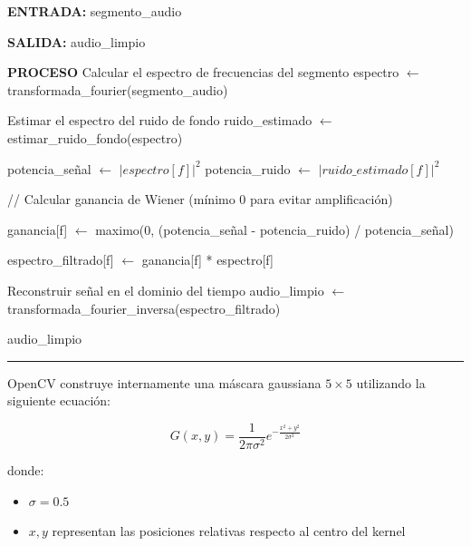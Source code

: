 \begin{algorithmic}[1]

\Statex \textbf{ENTRADA:}
\Statex segmento\_audio 

\Statex
\Statex \textbf{SALIDA:}
\Statex audio\_limpio 

\Statex
\Statex \textbf{PROCESO}
\State Calcular el espectro de frecuencias del segmento
\State espectro $\gets$ transformada\_fourier(segmento\_audio)

\Statex
\State Estimar el espectro del ruido de fondo
\State ruido\_estimado $\gets$ estimar\_ruido\_fondo(espectro)

\Statex
{}

    \State potencia\_señal $\gets$ $|espectro[f]|^2$
    \State potencia\_ruido $\gets$ $|ruido\_estimado[f]|^2$

    \Statex \hspace{0.5cm} // Calcular ganancia de Wiener (mínimo 0 para evitar amplificación)

    \State ganancia[f] $\gets$ maximo(0,
    \Statex \hspace{2.2cm} (potencia\_señal - potencia\_ruido) / potencia\_señal)

    \State espectro\_filtrado[f] $\gets$ ganancia[f] * espectro[f]

\EndFor

\Statex
\State Reconstruir señal en el dominio del tiempo
\State audio\_limpio $\gets$ transformada\_fourier\_inversa(espectro\_filtrado)

\Statex
\State \Return audio\_limpio

\end{algorithmic}
\vspace{-0.9cm}
\rule{\textwidth}{0.4pt}

OpenCV construye internamente una máscara gaussiana \(5 \times 5\) utilizando la siguiente ecuación:

\[
G(x,y)=\frac{1}{2\pi\sigma^2}e^{-\frac{x^2+y^2}{2\sigma^2}}
\]

donde:

\begin{itemize}
\item \(\sigma = 0.5\)
\item \(x,y\) representan las posiciones relativas respecto al centro del kernel
\end{itemize}

